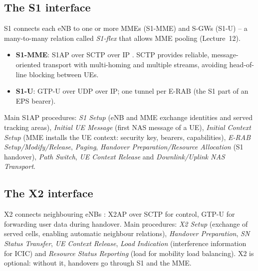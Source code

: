 \documentclass[11pt,a4paper]{article}
\begin{document}
\begin{acnfigure}
  \caption{Main LTE channel mapping. Almost all logical channels converge on the shared channels;
  PDCCH, PHICH, PCFICH and PUCCH carry layer-1/2 control without a transport channel.}
  \label{fig:channels}
\end{acnfigure}

\subsection{The S1 interface}
S1 connects each eNB to one or more MMEs (S1-MME) and S-GWs (S1-U) -- a many-to-many relation
called \emph{S1-flex} that allows MME pooling (Lecture~12).
\begin{itemize}
  \item \textbf{S1-MME}: S1AP over SCTP over IP \cite{ts36413}. SCTP provides reliable, message-oriented
        transport with multi-homing and multiple streams, avoiding head-of-line blocking between
        UEs.
  \item \textbf{S1-U}: GTP-U over UDP over IP; one tunnel per E-RAB (the S1 part of an EPS bearer).
\end{itemize}
Main S1AP procedures: \emph{S1 Setup} (eNB and MME exchange identities and served tracking areas),
\emph{Initial UE Message} (first NAS message of a UE), \emph{Initial Context Setup} (MME installs
the UE context: security key, bearers, capabilities), \emph{E-RAB Setup/Modify/Release},
\emph{Paging}, \emph{Handover Preparation/Resource Allocation} (S1 handover), \emph{Path Switch},
\emph{UE Context Release} and \emph{Downlink/Uplink NAS Transport}.

\subsection{The X2 interface}
X2 connects neighbouring eNBs \cite{ts36423}: X2AP over SCTP for control, GTP-U for forwarding user
data during handover. Main procedures: \emph{X2 Setup} (exchange of served cells, enabling automatic
neighbour relations), \emph{Handover Preparation}, \emph{SN Status Transfer}, \emph{UE Context
Release}, \emph{Load Indication} (interference information for ICIC) and \emph{Resource Status
Reporting} (load for mobility load balancing). X2 is optional: without it, handovers go through
S1 and the MME.
\end{document}
